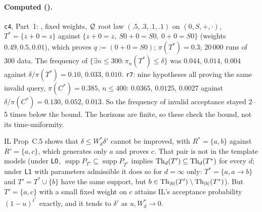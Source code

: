 \paragraph{Computed ().} \texttt{c4}, Part~1: \Lzero{}, fixed weights, $\mathcal{Q}$ root law $(.5,.3,.1,.1)$ on $(0,S,+,\cdot)$, $T^*=\{z+0=z\}$ against $\{z+0=z,\ S0+0=S0,\ 0+0=S0\}$ (weights $0.49,0.5,0.01$), which proves $q:=(0+0=S0)$; $\pi(T^*)=0.3$; $20\,000$ runs of $300$ data. The frequency of $\{\exists n\le300:\pi_n(T^*)\le\delta\}$ was $0.044$, $0.014$, $0.004$ against $\delta/\pi(T^*)=0.10$, $0.033$, $0.010$. \texttt{r7}: nine hypotheses all proving the same invalid query, $\pi(C^*)=0.385$, $n\le400$: $0.0365$, $0.0125$, $0.0027$ against $\delta/\pi(C^*)=0.130$, $0.052$, $0.013$. So the frequency of invalid acceptance stayed 2--5 times below the bound. The horizons are finite, so these check the bound, not its time-uniformity.

\begin{remark}\label{rem:sound:tight}
IL Prop~C.5 shows that $\delta\le W^*_d\delta'$ cannot be improved, with $R^*=\{a,b\}$ against $R'=\{a,c\}$, which generates only $a$ and proves $c$. That pair is not in the template models (under $\mathord{\mathsf{L0}}$, $\operatorname{supp}P_{T'}\subseteq\operatorname{supp}P_{T^*}$ implies $\mathrm{Th}_d(T')\subseteq\mathrm{Th}_d(T^*)$ for every $d$; under $\mathord{\mathsf{L1}}$ with parameters admissible it does so for $d=\infty$ only: $T^*=\{a,a\to b\}$ and $T'=T^*\cup\{b\}$ have the same support, but $b\in\mathrm{Th}_{|b|}(T')\setminus\mathrm{Th}_{|b|}(T^*)$). But $T'=\{a,c\}$ with a small fixed weight on $c$ attains IL's acceptance probability $(1-u)^{t^*}$ exactly, and it tends to $\delta'$ as $u,W^*_d\to0$.
\end{remark}

